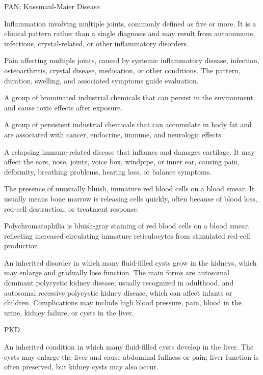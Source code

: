 \synonyms
PAN; Kussmaul-Maier Disease

 Inflammation involving multiple joints, commonly defined as five or more. It is a clinical pattern rather than a single diagnosis and may result from autoimmune, infectious, crystal-related, or other inflammatory disorders.

 Pain affecting multiple joints, caused by systemic inflammatory disease, infection, osteoarthritis, crystal disease, medication, or other conditions. The pattern, duration, swelling, and associated symptoms guide evaluation.

 A group of brominated industrial chemicals that can persist in the environment and cause toxic effects after exposure.

 A group of persistent industrial chemicals that can accumulate in body fat and are associated with cancer, endocrine, immune, and neurologic effects.

 A relapsing immune-related disease that inflames and damages cartilage. It may affect the ears, nose, joints, voice box, windpipe, or inner ear, causing pain, deformity, breathing problems, hearing loss, or balance symptoms.

 The presence of unusually bluish, immature red blood cells on a blood smear. It usually means bone marrow is releasing cells quickly, often because of blood loss, red-cell destruction, or treatment response.

 Polychromatophilia is bluish-gray staining of red blood cells on a blood smear, reflecting increased circulating immature reticulocytes from stimulated red-cell production.

 An inherited disorder in which many fluid-filled cysts grow in the kidneys, which may enlarge and gradually lose function. The main forms are autosomal dominant polycystic kidney disease, usually recognized in adulthood, and autosomal recessive polycystic kidney disease, which can affect infants or children. Complications may include high blood pressure, pain, blood in the urine, kidney failure, or cysts in the liver.

\synonyms
PKD

 An inherited condition in which many fluid-filled cysts develop in the liver. The cysts may enlarge the liver and cause abdominal fullness or pain; liver function is often preserved, but kidney cysts may also occur.

